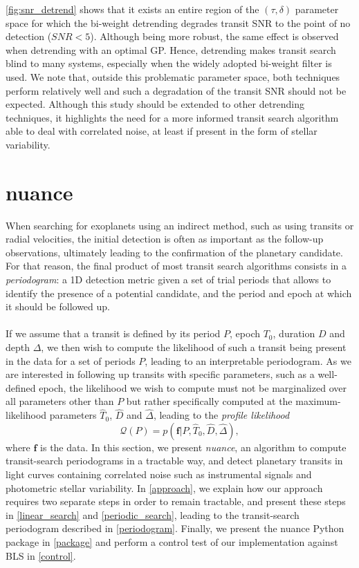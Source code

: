 \documentclass[modern]{aastex631}
\newcommand{\nuancecode}{\textsf{nuance}}
\begin{document}
\autoref{fig:snr_detrend} shows that it exists an entire region of the $(\tau, \delta)$ parameter space for which the bi-weight detrending degrades transit SNR to the point of no detection ($SNR < 5$). Although being more robust, the same effect is observed when detrending with an optimal GP. Hence, detrending makes transit search blind to many systems, especially when the widely adopted bi-weight filter is used. We note that, outside this problematic parameter space, both techniques perform relatively well and such a degradation of the transit SNR should not be expected. Although this study should be extended to other detrending techniques, it highlights the need for a more informed transit search algorithm able to deal with correlated noise, at least if present in the form of stellar variability.

\newpage
\section{\textsf{nuance}}\label{nuance}
When searching for exoplanets using an indirect method, such as using transits or radial velocities, the initial detection is often as important as the follow-up observations, ultimately leading to the confirmation of the planetary candidate. For that reason, the final product of most transit search algorithms consists in a \textit{periodogram}: a 1D detection metric given a set of trial periods that allows to identify the presence of a potential candidate, and the period and epoch at which it should be followed up.\\\\ 
If we assume that a transit is defined by its period $P$, epoch $T_0$, duration $D$ and depth $\Delta$, we then wish to compute the likelihood of such a transit being present in the data for a set of periods $P$, leading to an interpretable periodogram. As we are interested in following up transits with specific parameters, such as a well-defined epoch, the likelihood we wish to compute must not be marginalized over all parameters other than $P$ but rather specifically computed at the maximum-likelihood parameters $\hat T_0$, $\hat D$ and $\hat \Delta$, leading to the \textit{profile likelihood}
\begin{equation}\label{eq:periodogram}
       \mathcal{Q}(P) = p(\bm{f} \vert P, \hat T_0 ,\hat D, \hat \Delta),
\end{equation} 
where $\bm{f}$ is the data. In this section, we present \textit{nuance}, an algorithm to compute transit-search periodograms in a tractable way, and detect planetary transits in light curves containing correlated noise such as instrumental signals and photometric stellar variability. In \autoref{approach}, we explain how our approach requires two separate steps in order to remain tractable, and present these steps in \autoref{linear_search} and \autoref{periodic_search}, leading to the transit-search periodogram described in \autoref{periodogram}. Finally, we present the \nuancecode{} Python package in \autoref{package} and perform a control test of our implementation against \textsf{BLS} in \autoref{control}.
\end{document}
